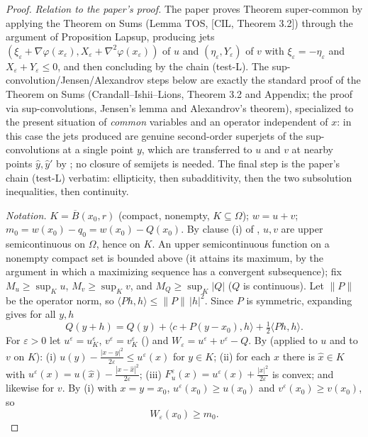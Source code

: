\begin{proof}
\emph{Relation to the paper's proof.} The paper proves Theorem super-common by applying the Theorem on Sums (Lemma TOS, [CIL, Theorem 3.2]) through the argument of Proposition Lapsup, producing jets $(\xi_\varepsilon+\nabla\varphi(x_\varepsilon),X_\varepsilon+\nabla^2\varphi(x_\varepsilon))$ of $u$ and $(\eta_\varepsilon,Y_\varepsilon)$ of $v$ with $\xi_\varepsilon=-\eta_\varepsilon$ and $X_\varepsilon+Y_\varepsilon\le0$, and then concluding by the chain (test-L). The sup-convolution/Jensen/Alexandrov steps below are exactly the standard proof of the Theorem on Sums (Crandall--Ishii--Lions, Theorem 3.2 and Appendix; the proof via sup-convolutions, Jensen's lemma and Alexandrov's theorem), specialized to the present situation of \emph{common} variables and an operator independent of $x$: in this case the jets produced are genuine second-order superjets of the sup-convolutions at a single point $y$, which are transferred to $u$ and $v$ at nearby points $\hat y,\hat y'$ by ; no closure of semijets is needed. The final step is the paper's chain (test-L) verbatim: ellipticity, then subadditivity, then the two subsolution inequalities, then continuity.

\emph{Notation.} $K=\overline B(x_0,r)$ (compact, nonempty, $K\subseteq\Omega$); $w=u+v$; $m_0=w(x_0)-q_0=w(x_0)-Q(x_0)$. By clause (i) of , $u,v$ are upper semicontinuous on $\Omega$, hence on $K$. An upper semicontinuous function on a nonempty compact set is bounded above (it attains its maximum, by the argument in which a maximizing sequence has a convergent subsequence); fix $M_u\ge\sup_Ku$, $M_v\ge\sup_Kv$, and $M_Q\ge\sup_K|Q|$ ($Q$ is continuous). Let $\|P\|$ be the operator norm, so $\langle Ph,h\rangle\le\|P\|\,|h|^2$. Since $P$ is symmetric, expanding gives for all $y,h$
\[
Q(y+h)=Q(y)+\langle c+P(y-x_0),h\rangle+\tfrac12\langle Ph,h\rangle . \tag{1}
\]
For $\varepsilon>0$ let $u^\varepsilon=u^\varepsilon_K$, $v^\varepsilon=v^\varepsilon_K$ () and $W_\varepsilon=u^\varepsilon+v^\varepsilon-Q$. By  (applied to $u$ and to $v$ on $K$): (i) $u(y)-\frac{|x-y|^2}{2\varepsilon}\le u^\varepsilon(x)$ for $y\in K$; (ii) for each $x$ there is $\hat x\in K$ with $u^\varepsilon(x)=u(\hat x)-\frac{|x-\hat x|^2}{2\varepsilon}$; (iii) $F_u^\varepsilon(x)=u^\varepsilon(x)+\frac{|x|^2}{2\varepsilon}$ is convex; and likewise for $v$. By (i) with $x=y=x_0$, $u^\varepsilon(x_0)\ge u(x_0)$ and $v^\varepsilon(x_0)\ge v(x_0)$, so
\[
W_\varepsilon(x_0)\ge m_0 . \tag{2}
\]


\end{proof}
